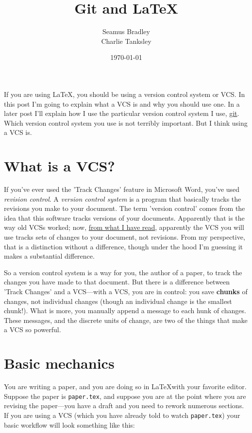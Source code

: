 \documentclass{article}
\title{Git and \LaTeX}
\author{Seamus Bradley\\Charlie Tanksley}
\date{\today}
\begin{document}
  \lstset{language=bash,breaklines=true,frame=single,frameround=tttt,basicstyle=\ttfamily}
  \maketitle
  \tableofcontents

If you are using \LaTeX, you should be using a version control system 
or VCS. In this post I'm going to explain what a VCS is and why you 
should use one. In a later post I'll explain how I use the particular 
version control system I use, \href{http://git-scm.com}{git}. Which 
version control system you use is not terribly important. But I think 
using a VCS is.

\section{What is a VCS?}

If you've ever used the 'Track Changes' feature in Microsoft Word, 
you've used \emph{revision control}. A \emph{version control system} 
is a program that basically tracks the revisions you make to your 
document. The term 'version control' comes from the idea that this 
software tracks versions of your documents. Apparently that is the way 
old VCSs worked; now, 
\href{http://www.joelonsoftware.com/items/2010/03/17.html}{from what I 
  have read}, apparently the VCS you will use tracks sets of changes 
to your document, not revisions. From my perspective, that is a 
distinction without a difference, though under the hood I'm guessing 
it makes a substantial difference.

So a version control system is a way for you, the author of a paper, 
to track the changes you have made to that document. But there is a 
difference between 'Track Changes' and a VCS—with a VCS, you are in 
control: you save \textbf{chunks} of changes, not individual changes 
(though an individual change is the smallest chunk!). What is more, 
you manually append a message to each hunk of changes. These messages, 
and the discrete units of change, are two of the things that make a 
VCS so powerful.

\section{Basic mechanics}

You are writing a paper, and you are doing so in \LaTeX with your 
favorite editor.  Suppose the paper is \lstinline!paper.tex!, and suppose 
you are at the point where you are revising the paper—you have a draft 
and you need to rework numerous sections. If you are using a VCS 
(which you have already told to watch \lstinline!paper.tex!) your basic 
workflow will look something like this:
\end{document}
